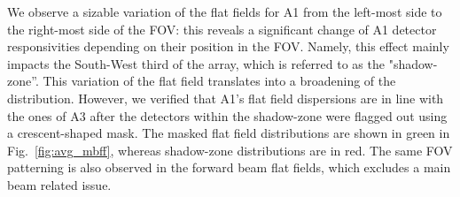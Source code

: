 We observe a sizable variation of the flat fields for A1 from the left-most side
to the right-most side of the FOV: this reveals a significant change of A1
detector responsivities depending on their position in the FOV. Namely, this
effect mainly impacts the South-West third of the array, which is
referred to as the "shadow-zone''. This variation of the
flat field translates into a broadening of the distribution. However, we verified that A1's
flat field dispersions are in line with the ones of A3 after the
detectors within the shadow-zone were flagged out using a
crescent-shaped mask. The masked flat field distributions are shown in
green in Fig.~\ref{fig:avg_mbff}, %
whereas shadow-zone distributions are in red. The same FOV patterning
is also observed in the forward beam flat fields, which excludes a
main beam related issue. 



